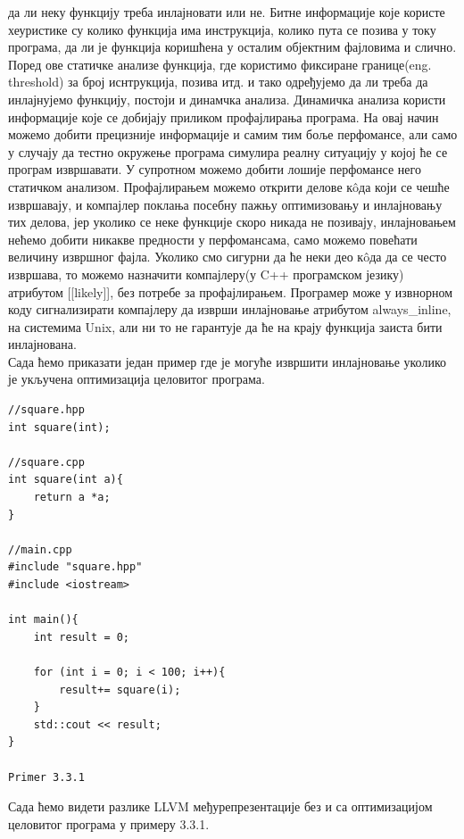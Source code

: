 \documentclass[12pt,oneside]{memoir}
\begin{document}
да ли неку функцију треба инлајновати или не.
Битне информације које користе хеуристике су колико функција има инструкција,
колико пута се позива у току програма, да ли је функција коришћена у осталим
објектним фајловима и слично.
Поред ове статичке анализе функција, где користимо фиксиране границе(eng. threshold)
за број иснтрукција, позива итд. и тако одређујемо да ли треба да инлајнујемо функцију,
постоји и динамчка анализа.
Динамичка анализа користи информације које се добијају приликом профајлирања програма.
На овај начин можемо добити прецизније информације и самим тим боље перфомансе,
али само у случају да тестно окружење програма симулира реалну ситуацију у којој
ће се програм извршавати.
У супротном можемо добити лошије перфомансе него статичком анализом.
Профајлирањем можемо открити делове к\^{o}да који се чешће извршавају, и компајлер 
поклања посебну пажњу оптимизовању и инлајновању тих делова, јер уколико се неке
функције скоро никада не позивају, инлајновањем нећемо добити никакве предности
у перфомансама, само можемо повећати величину извршног фајла.
Уколико смо сигурни да ће неки део к\^{o}да да се често извршава, то можемо назначити
компајлеру(у C++ програмском језику) атрибутом [[likely]], без потребе за
профајлирањем. 	
Програмер може у извнорном коду сигнализирати компајлеру да изврши инлајновање
атрибутом always{\_}inline, на системима Unix, али ни то не гарантује да ће на крају
функција заиста бити инлајнована.
\\
Сада ћемо приказати један пример где је могуће извршити инлајновање уколико
је укључена оптимизација целовитог програма.

\begin{lstlisting}
//square.hpp           
int square(int);         
    					
//square.cpp				
int square(int a){
    return a *a;
}

//main.cpp
#include "square.hpp"
#include <iostream>

int main(){
    int result = 0;
    
    for (int i = 0; i < 100; i++){
        result+= square(i);
    }
    std::cout << result;
}

Primer 3.3.1
\end{lstlisting}

Сада ћемо видети разлике LLVM међурепрезентације без и са оптимизацијом
целовитог програма у примеру 3.3.1.
\end{document}
